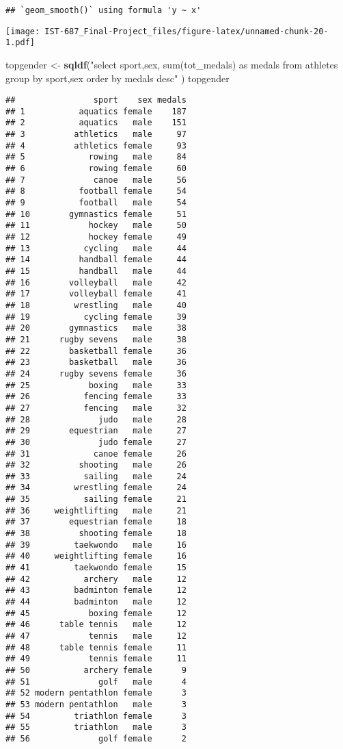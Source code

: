 \documentclass[]{article}
\newenvironment{Shaded}{\begin{snugshade}}{\end{snugshade}}
\newcommand{\KeywordTok}[1]{\textcolor[rgb]{0.13,0.29,0.53}{\textbf{#1}}}
\newcommand{\NormalTok}[1]{#1}
\newcommand{\StringTok}[1]{\textcolor[rgb]{0.31,0.60,0.02}{#1}}
\begin{document}
\begin{verbatim}
## `geom_smooth()` using formula 'y ~ x'
\end{verbatim}

\texttt{[image: IST-687\_Final-Project\_files/figure-latex/unnamed-chunk-20-1.pdf]}

\begin{Shaded}
\begin{Highlighting}[]
\NormalTok{topgender <-}\StringTok{ }\KeywordTok{sqldf}\NormalTok{(}\StringTok{"select sport,sex, sum(tot_medals) as medals from athletes group by sport,sex order by medals desc"}\NormalTok{  )}
\NormalTok{topgender}
\end{Highlighting}
\end{Shaded}

\begin{verbatim}
##                sport    sex medals
## 1           aquatics female    187
## 2           aquatics   male    151
## 3          athletics   male     97
## 4          athletics female     93
## 5             rowing   male     84
## 6             rowing female     60
## 7              canoe   male     56
## 8           football female     54
## 9           football   male     54
## 10        gymnastics female     51
## 11            hockey   male     50
## 12            hockey female     49
## 13           cycling   male     44
## 14          handball female     44
## 15          handball   male     44
## 16        volleyball   male     42
## 17        volleyball female     41
## 18         wrestling   male     40
## 19           cycling female     39
## 20        gymnastics   male     38
## 21      rugby sevens   male     38
## 22        basketball female     36
## 23        basketball   male     36
## 24      rugby sevens female     36
## 25            boxing   male     33
## 26           fencing female     33
## 27           fencing   male     32
## 28              judo   male     28
## 29        equestrian   male     27
## 30              judo female     27
## 31             canoe female     26
## 32          shooting   male     26
## 33           sailing   male     24
## 34         wrestling female     24
## 35           sailing female     21
## 36     weightlifting   male     21
## 37        equestrian female     18
## 38          shooting female     18
## 39         taekwondo   male     16
## 40     weightlifting female     16
## 41         taekwondo female     15
## 42           archery   male     12
## 43         badminton female     12
## 44         badminton   male     12
## 45            boxing female     12
## 46      table tennis   male     12
## 47            tennis   male     12
## 48      table tennis female     11
## 49            tennis female     11
## 50           archery female      9
## 51              golf   male      4
## 52 modern pentathlon female      3
## 53 modern pentathlon   male      3
## 54         triathlon female      3
## 55         triathlon   male      3
## 56              golf female      2
\end{verbatim}
\end{document}
